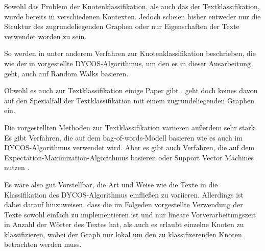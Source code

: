 Sowohl das Problem der Knotenklassifikation, als auch das der Textklassifikation,
wurde bereits in verschiedenen Kontexten. Jedoch scheien bisher entweder nur die Struktur des zugrundeliegenden Graphen oder nur Eigenschaften der Texte verwendet worden zu sein.

So werden in \cite{bhagat,szummer} unter anderem Verfahren zur Knotenklassifikation
beschrieben, die wie der in \cite{aggarwal2011} vorgestellte DYCOS-Algorithmus,
um den es in dieser Ausarbeitung geht, auch auf Random Walks basieren.

Obwohl es auch zur Textklassifikation einige Paper gibt \cite{Zhu02learningfrom,Jiang2010302}, geht doch keines davon auf den Spezialfall der Textklassifikation
mit einem zugrundeliegenden Graphen ein.

Die vorgestellten Methoden zur Textklassifikation variieren außerdem sehr stark.
Es gibt Verfahren, die auf dem bag-of-words-Modell basieren \cite{Ko:2012:STW:2348283.2348453}
wie es auch im DYCOS-Algorithmus verwendet wird. Aber es gibt auch Verfahren,
die auf dem Expectation-Maximization-Algorithmus basieren \cite{Nigam99textclassification}
oder Support Vector Machines nutzen \cite{Joachims98textcategorization}.

Es wäre also gut Vorstellbar, die Art und Weise wie die Texte in die Klassifikation
des DYCOS-Algorithmus einfließen zu variieren. Allerdings ist dabei darauf hinzuweisen,
dass die im Folgeden vorgestellte Verwendung der Texte sowohl einfach zu implementieren
ist und nur lineare Vorverarbeitungszeit in Anzahl der Wörter des Textes hat,
als auch es erlaubt einzelne
Knoten zu klassifizieren, wobei der Graph nur lokal um den zu klassifizerenden
Knoten betrachten werden muss.